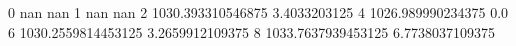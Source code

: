 0 nan nan
1 nan nan
2 1030.393310546875 3.4033203125
4 1026.989990234375 0.0
6 1030.2559814453125 3.2659912109375
8 1033.7637939453125 6.7738037109375
